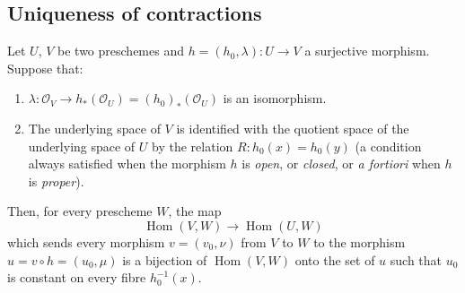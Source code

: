 \subsection{Uniqueness of contractions}
\label{subsection:II.8.11}

\begin{lemma}[8.11.1]
\label{II.8.11.1}
Let $U$, $V$ be two preschemes and
$h=(h_0,\lambda):U\to V$ a surjective morphism. Suppose that:
\begin{enumerate}
  \item[$1^\circ$]
  $\lambda:\mathcal{O}_V\to h_*(\mathcal{O}_U)
  =(h_0)_*(\mathcal{O}_U)$ is an isomorphism.
  \item[$2^\circ$] The underlying space of $V$ is identified with the
  quotient space of the underlying space of $U$ by the relation
  $R:h_0(x)=h_0(y)$ \textup{(a condition always satisfied when the morphism $h$ is
  \emph{open}, or \emph{closed}, or \emph{a fortiori} when $h$ is \emph{proper})}.
\end{enumerate}
Then, for every prescheme $W$, the map
\begin{equation}
\label{II.8.11.1.1}
  \operatorname{Hom}(V,W)\longrightarrow\operatorname{Hom}(U,W)
\tag{8.11.1.1}
\end{equation}
which sends every morphism $v=(v_0,\nu)$ from $V$ to $W$ to the
morphism $u=v\circ h=(u_0,\mu)$ is a bijection of
$\operatorname{Hom}(V,W)$ onto the set of $u$ such that $u_0$ is
constant on every fibre $h_0^{-1}(x)$.
\end{lemma}

